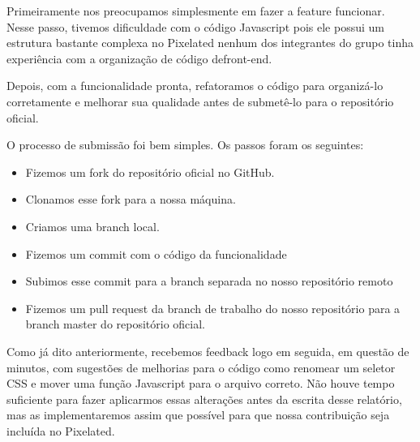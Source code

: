 Primeiramente nos preocupamos simplesmente em fazer a feature funcionar.
Nesse passo, tivemos dificuldade com o código Javascript pois ele
possui um estrutura bastante complexa no Pixelated nenhum dos integrantes do
grupo tinha experiência com a organização de código defront-end.

Depois, com a funcionalidade pronta, refatoramos o código para organizá-lo
corretamente e melhorar sua qualidade antes de submetê-lo para o repositório oficial.

O processo de submissão foi bem simples. Os passos foram os seguintes:
  \begin{itemize}
    \item Fizemos um fork do repositório oficial no GitHub.
    \item Clonamos esse fork para a nossa máquina.
    \item Criamos uma branch local.
    \item Fizemos um commit com o código da funcionalidade
    \item Subimos esse commit para a branch separada no nosso repositório remoto
    \item Fizemos um pull request da branch de trabalho do nosso repositório
    para a branch master do repositório oficial.
  \end{itemize}

Como já dito anteriormente, recebemos feedback logo em seguida, em questão de
minutos, com sugestões de melhorias para o código como renomear um seletor CSS
e mover uma função Javascript para o arquivo correto. Não houve tempo suficiente
para fazer aplicarmos essas alterações antes da escrita desse relatório, mas
as implementaremos assim que possível para que nossa contribuição seja incluída
no Pixelated.